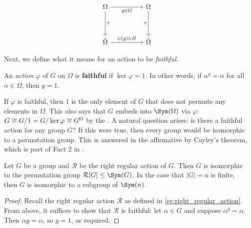 \[\begin{tikzcd}
        {\Omega} && {\Omega} \\
        \\
        {\tilde\Omega} && {\tilde\Omega}
        \arrow["\tau", from=1-1, to=3-1]
        \arrow["\tau"', from=1-3, to=3-3]
        \arrow["{\psi(g) \in H}", from=3-1, to=3-3]
        \arrow["{g \in G}"', from=1-1, to=1-3]
    \end{tikzcd}\]


Next, we define what it means for an action to be \textit{faithful}.

\begin{definition}\label{def:faithful_action}
    An \textit{action} $\varphi$ of $G$ on $\Omega$ is \textbf{faithful} if $\ker\varphi = 1$. In other words, if $\alpha^g = \alpha$ for all $\alpha \in \Omega$, then $g = 1$.
\end{definition}

If $\varphi$ is faithful, then $1$ is the only element of $G$ that does not permute any elements in $\Omega$. This also says that $G$ embeds into $\Sym(\Omega)$ via $\varphi$: $G \cong G/1 = G/\ker\varphi \cong \added{1}{G^\Omega}$ by the . A natural question arises: is there a faithful action for any group $G$? If this were true, then every group would be isomorphic to a permutation group. This is answered in the affirmative by Cayley's theorem, which is part of Fact 2 in \cite{blaha1992}.

\begin{theorem}[Cayley]\label{thm:cayley}
    Let $G$ be a group and $\mathcal{R}$ be the right regular action of $G$. Then $G$ is isomorphic to the permutation group $\mathcal{R}[G] \leq \Sym(G)$. In the case that $|G| = n$ is finite, then $G$ is isomorphic to a subgroup of $\Sym(n)$.
\end{theorem}

\begin{proof}
    Recall the right regular action $\mathcal{R}$ as defined in \autoref{eg:right_regular_action}. From above, it suffices to show that $\mathcal{R}$ is faithful: let $\alpha \in G$ and suppose $\alpha^g = \alpha$. Then $\alpha g = \alpha$, so  $g = 1$, as required.
\end{proof}

